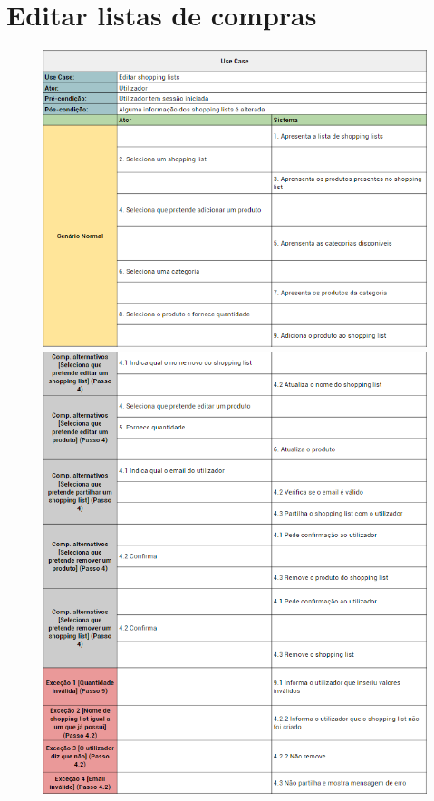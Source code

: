 \documentclass[a4paper]{report}
\begin{document}
    \section{Editar listas de compras}
        \begin{figure}[H]
        \centering
            \includegraphics[width=\textwidth]{images/usecases/editar_shoppinglist_1.png}
            \includegraphics[width=\textwidth]{images/usecases/editar_shoppinglist_2.png}
        \end{figure}
\end{document}

